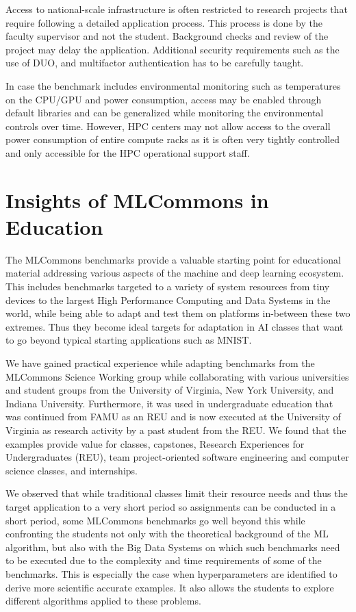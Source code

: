 \documentclass[utf8]{FrontiersinVancouver} %
\begin{document}
Access to national-scale infrastructure is often restricted to
research projects that require following a detailed application
process. This process is done by the faculty supervisor and not the
student. Background checks and review of the project may delay the
application. Additional security requirements such as the use of DUO,
and multifactor authentication has to be carefully taught.

In case the benchmark includes environmental monitoring such as
temperatures on the CPU/GPU and power consumption, access may be
enabled through default libraries and can be generalized while
monitoring the environmental controls over time. However, HPC centers
may not allow access to the overall power consumption of entire
compute racks as it is often very tightly controlled and only
accessible for the HPC operational support staff.

\section{Insights of MLCommons in Education}
\label{sec:edu-mlcommons-insights}

The MLCommons benchmarks provide a valuable starting point for
educational material addressing various aspects of the machine and
deep learning ecosystem. This includes benchmarks targeted to a
variety of system resources from tiny devices to the largest High
Performance Computing and Data Systems in the world, while being able
to adapt and test them on platforms in-between these two
extremes. Thus they become ideal targets for adaptation in AI classes
that want to go beyond typical starting applications such as MNIST.

We have gained practical experience while adapting benchmarks from the
MLCommons Science Working group while collaborating with various
universities and student groups from the University of Virginia, New
York University, and Indiana University. Furthermore, it was used in
undergraduate education that was continued from FAMU as an REU and is
now executed at the University of Virginia as research activity by a
past student from the REU. We found that the examples provide value
for classes, capstones, Research Experiences for Undergraduates (REU),
team project-oriented software engineering and computer science
classes, and internships.

We observed that while traditional classes limit their resource needs
and thus the target application to a very short period so assignments
can be conducted in a short period, some MLCommons benchmarks go well
beyond this while confronting the students not only with
the theoretical background of the ML algorithm, but also with the Big Data
Systems on which such benchmarks need to be executed due to the
complexity and time requirements of some of the benchmarks. This is
especially the case when hyperparameters are identified to derive more
scientific accurate examples. It also allows the students to explore
different algorithms applied to these problems.
\end{document}
